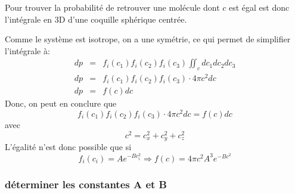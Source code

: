 Pour trouver la probabilité de retrouver une molécule dont $c$ est égal est donc l'intégrale en 3D d'une coquille sphérique centrée.

Comme le système est isotrope, on a une symétrie, ce qui permet de simplifier l'intégrale à:
\begin{eqnarray} 
dp &=& f_i(c_1)f_i(c_2)f_i(c_3) \iint_{c}{dc_1dc_2dc_3} \\
dp &=& f_i(c_1)f_i(c_2)f_i(c_3)\cdot4\pi c^2dc \\
dp &=& f(c)dc
\end{eqnarray}
Donc, on peut en conclure que 
$$ f_i(c_1)f_i(c_2)f_i(c_3)\cdot 4\pi c^2dc = f(c)dc$$
avec
$$ c^2 = c_x^2 + c_y^2 + c_z^2 $$
L'égalité n'est donc possible que si 
$$f_i(c_i) = A e^{-Bc_i^2} \Rightarrow f(c) = 4\pi c^2 A^3 e^{-Bc^2} $$


\subsubsection{déterminer les constantes A et B}




